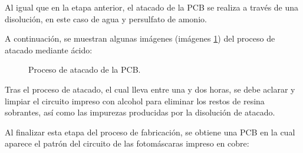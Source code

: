 \begin{enumerate}
   Al igual que en la etapa anterior, el atacado de la \ac{PCB} se realiza a través de una disolución, en este caso de agua y persulfato de amonio.
   
   A continuación, se muestran algunas imágenes (imágenes \ref{fig:Atacado_PCB}) del proceso de atacado mediante ácido:
   

   \begin{figure}[H]
    \centering
    \caption{Proceso de atacado de la \ac{PCB}.}
    \label{fig:Atacado_PCB}
    \end{figure}
    
    Tras el proceso de atacado, el cual lleva entre una y dos horas, se debe aclarar y limpiar el circuito impreso con alcohol para eliminar los restos de resina sobrantes, así como las impurezas producidas por la disolución de atacado.
    
    Al finalizar esta etapa del proceso de fabricación, se obtiene una \ac{PCB} en la cual aparece el patrón del circuito de las fotomáscaras impreso en cobre:
    


\end{enumerate}
